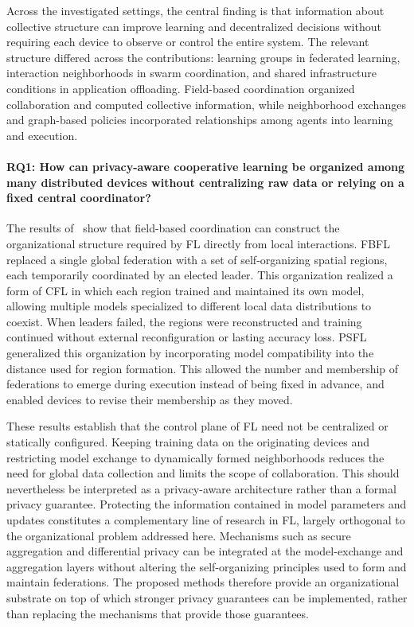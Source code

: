 Across the investigated settings, the central finding is that information about
 collective structure can improve learning and decentralized decisions
 without requiring each device to observe or control the entire system.
%
The relevant structure differed across the contributions:
 learning groups in federated learning, interaction neighborhoods in swarm coordination,
 and shared infrastructure conditions in application offloading.
%
Field-based coordination organized collaboration and computed collective information,
 while neighborhood exchanges and graph-based policies incorporated relationships
 among agents into learning and execution.
%

\paragraph{RQ1: How can privacy-aware cooperative learning be organized among
many distributed devices without centralizing raw data or relying on a fixed
central coordinator?}
%
The results of~ show that field-based coordination 
 can construct the organizational structure required by \gls{FL}
 directly from local interactions.
%
FBFL replaced a single global federation 
 with a set of self-organizing spatial regions, 
 each temporarily coordinated by an elected leader. 
% 
This organization realized a form of \gls{CFL} 
 in which each region trained and maintained its own model, 
 allowing multiple models specialized to different local data distributions to coexist. 
% 
When leaders failed, 
 the regions were reconstructed and training continued 
 without external reconfiguration or lasting accuracy loss.
%
PSFL generalized this organization by incorporating model compatibility 
 into the distance used for region formation. 
% 
This allowed the number and membership of federations 
 to emerge during execution instead of being fixed in advance, 
 and enabled devices to revise their membership as they moved.

These results establish that the control plane of \gls{FL} need not be centralized 
 or statically configured.
%
Keeping training data on the originating devices 
 and restricting model exchange to dynamically formed neighborhoods reduces the need 
 for global data collection and limits the scope of collaboration.
%
This should nevertheless be interpreted as a privacy-aware architecture 
 rather than a formal privacy guarantee. 
% 
Protecting the information contained in model parameters 
 and updates constitutes a complementary line of research in \gls{FL}, 
 largely orthogonal to the organizational problem addressed here. 
% 
Mechanisms such as secure aggregation 
 and differential privacy can be integrated at the model-exchange 
 and aggregation layers without altering the self-organizing principles 
 used to form and maintain federations. 
% 
The proposed methods therefore provide an organizational substrate 
 on top of which stronger privacy guarantees can be implemented, 
 rather than replacing the mechanisms that provide those guarantees.

